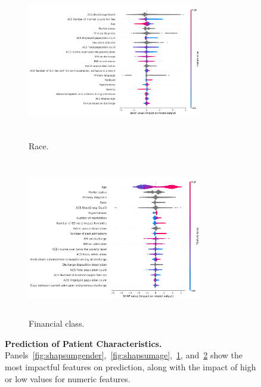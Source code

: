 \begin{figure}
\begin{adjustbox}{minipage=7.0in,frame}
\vspace{5mm}
\begin{subfigure}[t]{.45\linewidth}
    \centering
    \captionsetup[subfigure]{}
    \caption{Race. }\label{fig:shapsumrace}
    \includegraphics[height=2.7in,width=3in]{other/race_SHAP_summary.pdf}
\end{subfigure}%
\hspace{5mm}%
\begin{subfigure}[t]{.45\linewidth}
    \centering
    \captionsetup[subfigure]{}
    \caption{Financial class.}\label{fig:shapsuminsurance}
    \includegraphics[height=2.7in,width=3in]{other/insurance_SHAP_summary.pdf}
\end{subfigure}%

\caption{\textbf{Prediction of Patient Characteristics.} \\
Panels~\ref{fig:shapsumgender},~\ref{fig:shapsumage},~\ref{fig:shapsumrace}, and~\ref{fig:shapsuminsurance} 
show the most impactful features on prediction, 
along with the impact of high or low values for numeric features.
}\label{fig:otherfig}
\end{adjustbox}
\end{figure}
